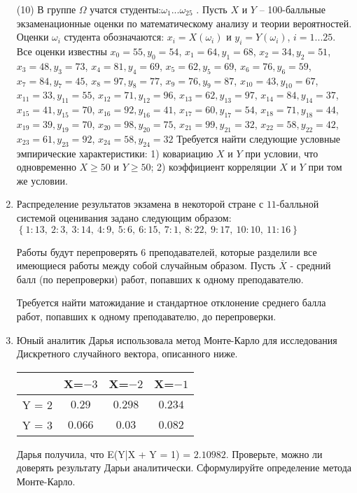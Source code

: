 \documentclass[a4paper,10pt]{article}
\begin{document}
\begin{enumerate}
(10) В группе $\Omega$ учатся студенты:$\omega _{1}...\omega _{25}$ . Пусть $X$ и $Y$ – 100-балльные экзаменационные оценки по
математическому анализу и теории вероятностей. Оценки $\omega _{i}$ студента обозначаются: $x _{i} = X(\omega _{i})$ и $y _{i} = Y(\omega _{i})$, $i = 1...25$. Все оценки известны
$x _{0} = 55, y _{0} = 54$, $x _{1} = 64, y _{1} = 68$, $x _{2} = 34, y _{2} = 51$, $x _{3} = 48, y _{3} = 73$, $x _{4} = 81, y _{4} = 69$, $x _{5} = 62, y _{5} = 69$, $x _{6} = 76, y _{6} = 59$, $x _{7} = 84, y _{7} = 45$, $x _{8} = 97, y _{8} = 77$, $x _{9} = 76, y _{9} = 87$, $x _{10} = 43, y _{10} = 67$, $x _{11} = 33, y _{11} = 55$, $x _{12} = 71, y _{12} = 96$, $x _{13} = 62, y _{13} = 97$, $x _{14} = 84, y _{14} = 37$, $x _{15} = 41, y _{15} = 70$, $x _{16} = 92, y _{16} = 41$, $x _{17} = 60, y _{17} = 54$, $x _{18} = 71, y _{18} = 44$, $x _{19} = 39, y _{19} = 70$, $x _{20} = 98, y _{20} = 75$, $x _{21} = 99, y _{21} = 32$, $x _{22} = 58, y _{22} = 42$, $x _{23} = 61, y _{23} = 92$, $x _{24} = 58, y _{24} = 32$
Требуется
найти следующие условные эмпирические характеристики: 1) ковариацию $X$ и $Y$ при условии, что одновременно $X \geqslant 50$
 и $Y \geqslant 50$; 2) коэффициент корреляции $X$ и $Y$ при том же условии.


\item

    
    	Распределение результатов экзамена в некоторой стране с $11$-балльной системой оценивания задано следующим образом:
    	$\left\{ 1 : 13, \  2 : 3, \  3 : 14, \  4 : 9, \  5 : 6, \  6 : 15, \  7 : 1, \  8 : 22, \  9 : 17, \  10 : 10, \  11 : 16\right\}$

	Работы будут перепроверять $6$ преподавателей, которые разделили все имеющиеся работы между собой случайным образом. Пусть $\overline{X}$ - средний балл (по перепроверки) работ, попавших к одному преподавателю.

	Требуется найти матожидание и стандартное отклонение среднего балла работ, попавших к одному преподавателю, до перепроверки.
    

\item

    
    	Юный аналитик Дарья использовала метод Монте-Карло для исследования Дискретного случайного вектора, описанного ниже.

        \begin{tabular}{|c|c|c|c|}
	\hline
	& X=$-3$ & X=$-2$ & X=$-1$ \\
	\hline
	Y = $2$ & $0.29$ & $0.298$  &  $0.234$ \\
	\hline
	Y = $3$ & $0.066$ & $0.03$ & $0.082$  \\
	\hline
\end{tabular}

    	Дарья получила, что E(Y|X + Y = 1) = $2.10982$.
    	Проверьте, можно ли доверять результату Дарьи аналитически. Сформулируйте определение метода Монте-Карло.
    

\end{enumerate}
\end{document}
